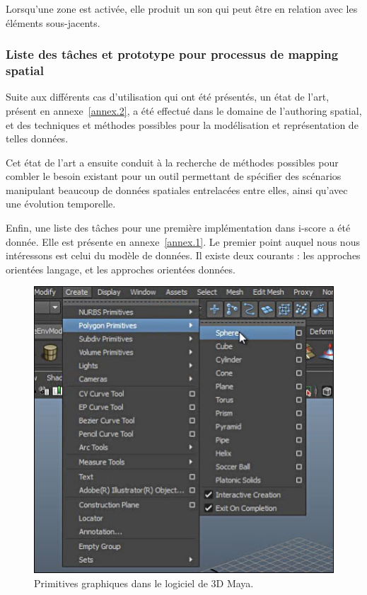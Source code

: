 \documentclass[french,12pt]{article}
\begin{document}
Lorsqu'une zone est activée, elle produit un son qui peut être en relation avec les éléments sous-jacents. %

\subsubsection{Liste des tâches et prototype pour processus de mapping spatial}
Suite aux différents cas d'utilisation qui ont été présentés, un état de l'art, présent en annexe~\ref{annex.2},
a été effectué dans le domaine de l'authoring spatial, et des techniques et méthodes possibles pour la modélisation et représentation de telles données.

Cet état de l'art a ensuite conduit à la recherche de méthodes possibles pour combler le besoin existant pour un outil permettant de spécifier des scénarios manipulant beaucoup de données spatiales entrelacées entre elles, ainsi qu'avec une évolution temporelle.

Enfin, une liste des tâches pour une première implémentation dans i-score a été donnée. Elle est présente en annexe~\ref{annex.1}.
Le premier point auquel nous nous intéressons est celui du modèle de données. Il existe deux courants : les approches orientées langage, et les approches orientées données. 

\begin{figure}[h]
    \centering
    \includegraphics[scale=0.5]{images/maya.jpg}
    \caption{Primitives graphiques dans le logiciel de 3D Maya.}
    \label{fig.maya}
\end{figure} 
\end{document}

